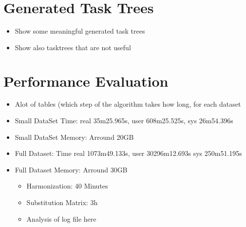 \section{Generated Task Trees}
\begin{itemize}
	\item Show some meaningful generated task trees
	\item Show also tasktrees that are not useful
\end{itemize}
\section{Performance Evaluation}

\begin{itemize}
	\item Alot of tables (which step of the algorithm takes how long, for each dataset

	\item Small DataSet Time: real    35m25.965s, user    608m25.525s, sys     26m54.396s
	\item Small DataSet Memory: Arround 20GB
	\item Full Dataset: Time real    1073m49.133s, user    30296m12.693s sys     250m51.195s
	\item Full Dataset Memory: Arround 30GB

		\begin{itemize}
			\item Harmonization: 40 Minutes
			\item Substitution Matrix: 3h
			\item Analysis of log file here
		\end{itemize}


\end{itemize}

